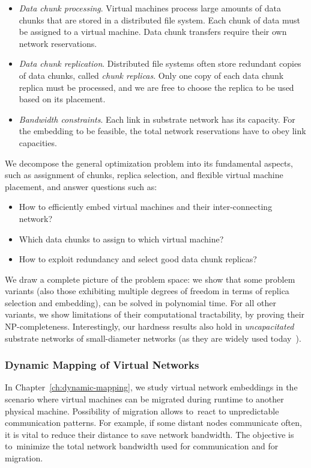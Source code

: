 \begin{itemize}
\item \emph{Data chunk processing}. Virtual machines process large amo\-unts of data chunks that are stored in a distributed file system. Each chunk of data must be assigned to a virtual machine. Data chunk transfers require their own network reservations.

\item \emph{Data chunk replication}. Distributed file systems often store redundant copies of data chunks, called \emph{chunk replicas}. Only one copy of each data chunk replica must be processed, and we are free to choose the replica to be used based on its placement.

\item \emph{Bandwidth constraints}. Each link in substrate network has its capacity. For the embedding to be feasible, the total network reservations have to obey link capacities.
\end{itemize}


We decompose the general optimization problem into its fundamental aspects, such as
assignment of chunks, replica selection, and flexible virtual machine
placement, and answer questions such as:
\begin{itemize}
\item How to efficiently embed virtual machines and their inter-connecting network?
\item Which data chunks to assign to which virtual machine?
\item How to exploit redundancy and select good data chunk replicas?
\end{itemize}

We draw a complete picture of the problem space: we show that
some problem variants (also those exhibiting multiple degrees of freedom in terms of
replica selection and embedding),
can be solved in polynomial time. For all other variants, we show limitations of their
computational tractability, by proving their NP-completeness. Interestingly,
our hardness results also hold in \emph{uncapacitated} substrate
networks of small-diameter networks (as they are
widely used today~\cite{fattree}).


\subsubsection{Dynamic Mapping of Virtual Networks}
\label{sec:contributions-dynamic-mapping}

In Chapter~\ref{ch:dynamic-mapping}, we study virtual network embeddings in the scenario where virtual machines can be migrated during runtime to another physical machine.
Possibility of migration allows to~react to unpredictable communication patterns.
For example, if some distant nodes communicate often, it is vital to reduce their distance to save network bandwidth.
The objective is to~minimize the total network bandwidth used for communication and for migration.

